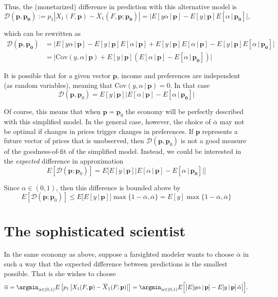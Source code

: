\documentclass[english, a4paper,12pt]{article}
\begin{document}
Thus, the (monetarized) difference in prediction with this alternative model is
	$$\mathcal{D}(\mathbf{p}, \mathbf{p_{0}}) := p_{1} \left| X_{1}(F, \mathbf{p}) - \overline{X}_{1}(F, \mathbf{p}; \mathbf{p_{0}})\right| 
		= \big| E[y\alpha \, | \, \mathbf{p}] - E[y \, | \, \mathbf{p}] E[\alpha \, | \, \mathbf{p_{0}}] \big|,
	$$

which can be rewritten as
	\begin{align*}
		\mathcal{D}(\mathbf{p}, \mathbf{p_{0}})
			&=	\big| E[y\alpha \, | \, \mathbf{p}] - E[y \, | \, \mathbf{p}] E[\alpha \, | \, \mathbf{p}] + E[y \, | \, \mathbf{p}] E[\alpha \, | \, \mathbf{p}] - E[y \, | \, \mathbf{p}] E[\alpha \, | \, \mathbf{p_{0}}] \big|	\\
			&=	\big| \mathrm{Cov}(y,\alpha \,|\, \mathbf{p}) + E[y\,|\, \mathbf{p}]\left(E[\alpha \, | \, \mathbf{p}] - E[\alpha \, | \, \mathbf{p_{0}}]\right) \big|
	\end{align*}

It is possible that for a given vector $\mathbf{p}$, income and preferences are independent (as random variables), meaning that $\mathrm{Cov}(y,\alpha \,|\, \mathbf{p}) = 0$. In that case
	$$\mathcal{D}(\mathbf{p}, \mathbf{p}_{0}) = E[y\,|\, \mathbf{p}]\big|E[\alpha \, | \, \mathbf{p}] - E[\alpha \, | \, \mathbf{p_{0}}]\big| $$

Of course, this means that when $\mathbf{p} = \mathbf{p}_{0}$ the economy will be perfectly described with this simplified model. In the general case, however, the choice of $\overline{\alpha}$ may not be optimal if changes in prices trigger changes in preferences. If $\mathbf{p}$ represents a future vector of prices that is unobserved, then $\mathcal{D}(\mathbf{p}, \mathbf{p}_{0})$ is not a good measure of the goodness-of-fit of the simplified model. Instead, we could be interested in the \textit{expected} difference in approximation
	$$E[\mathcal{D}(\mathbf{p}; \mathbf{p}_{0})] =
		E\Big[ E[y\,|\,\mathbf{p}]\big|E[\alpha \, | \, \mathbf{p}] - E[\alpha \, | \, \mathbf{p_{0}}]\big| \Big]
	$$

Since $\alpha \in (0,1)$, then this difference is bounded above by
	$$E[\mathcal{D}(\mathbf{p}; \mathbf{p}_{0})] \leq 
		E\Big[ E[y\,|\,\mathbf{p}]\Big] \max\{ 1 - \overline{\alpha}, \overline{\alpha}\} = E[y]\max\big\{1-\overline{\alpha}, \overline{\alpha}\big\}
	$$
 
\section{The sophisticated scientist}
In the same economy as above, suppose a farsighted modeler wants to choose $\overline{\alpha}$ in such a way that the expected difference between predictions is the smallest possible. That is she wishes to choose
	\begin{equation*} %
		\overline{\alpha}
			= \argmin_{\hat{\alpha} \in (0,1)} E\left[p_{1}\left| X_{1}(F,\mathbf{p}) - \overline{X}_{1}(F; \mathbf{p})\right|\right]
			= \argmin_{\hat{\alpha} \in (0,1)} E\Big[\big| E[y \alpha\, |\, \mathbf{p}] - E[y \,|\, \mathbf{p}]\, \hat{\alpha} \big|\Big].
	\end{equation*}
\end{document}
